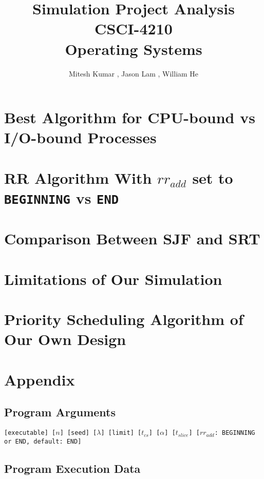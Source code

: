 \documentclass{article}
\title{\textbf{Simulation Project Analysis} \\ 
       \textbf{CSCI-4210} \\ 
       \textbf{Operating Systems}}
\author{Mitesh Kumar {\tt <kumarm4>}, Jason Lam {\tt <lamj7>}, William He {\tt <hew7>}}
\begin{document}
\maketitle

\section{Best Algorithm for CPU-bound vs I/O-bound Processes}
\section{RR Algorithm With {\tt $rr_{add}$} set to {\tt BEGINNING} vs {\tt END}}
\section{Comparison Between SJF and SRT}
\section{Limitations of Our Simulation}
\section{Priority Scheduling Algorithm of Our Own Design}
\section{Appendix}
\subsection*{Program Arguments}
{\tt[executable] [$n$] [seed] [$\lambda$] [limit] [$t_{cs}$] [$\alpha$] [$t_{slice}$] [$rr_{add}$: BEGINNING or END, default: END]}

\subsection*{Program Execution Data}

\begin{table}[h!]
  \caption{{\tt [$n$: 2] [seed: 2] [$\lambda$: 0.01] [limit: 256] [$t_{cs}$: 4] [$\alpha$: 0.5] [$t_{slice}$: 128]}}
  
\end{table}
\end{document}
